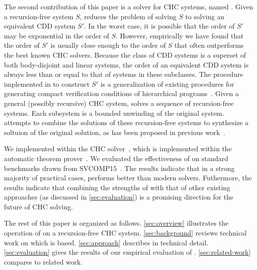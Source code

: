 The second contribution of this paper is a solver for CHC systems,
named \sys.
%
Given a recursion-free system $S$, \sys reduces the problem
of solving $S$ to solving an equivalent CDD system
$S'$.
%
In the worst case, it is possible that the order of $S'$ may be
exponential in the order of $S$.
%
However, empirically we have found that the order of $S'$ is usually
close enough to the order of $S$ that \sys often outperforms the best
known CHC solvers.
%
Because the class of CDD systems is a superset of both body-disjoint
and linear systems, the order of an equivalent CDD system is always
less than or equal to that of systems in these subclasses.
%
The procedure implemented in \sys to construct $S'$ is a
generalization of existing procedures for generating compact
verification conditions of hierarchical
programs~\cite{flanagan01,lal-qadeer15}.
%
Given a general (possibly recursive) CHC system, \sys solves a sequence of
recursion-free systems.
%
Each subsystem is a bounded unwinding of the original system. \sys
attempts to combine the solutions of these recursion-free systems to
synthesize a soltuion of the original solution, as has been proposed
in previous work~\cite{rummer13b}.

We implemented \sys within the \duality CHC solver~\cite{bjorner13},
which is implemented within the \zthree automatic theorem
prover~\cite{moura08}.
%
We evaluated the effectiveness of \sys on standard benchmarks drawn
from SVCOMP15~\cite{svcomp15}.
%
The results indicate that in a strong majority of practical cases,
\sys performs better than modern solvers.
%
Futhermore, the results indicate that combining the strengths of \sys
with that of other existing approaches (as discussed in
\autoref{sec:evaluation}) is a promising direction for the future of
CHC solving.

The rest of this paper is organized as follows.
%
\autoref{sec:overview} illustrates the operation of \sys on a
recursion-free CHC system.
%
\autoref{sec:background} reviews technical work on which \sys is
based.
%
\autoref{sec:approach} describes \sys in technical detail.
%
\autoref{sec:evaluation} gives the results of our empirical evaluation
of \sys.
%
\autoref{sec:related-work} compares \sys to related work.

